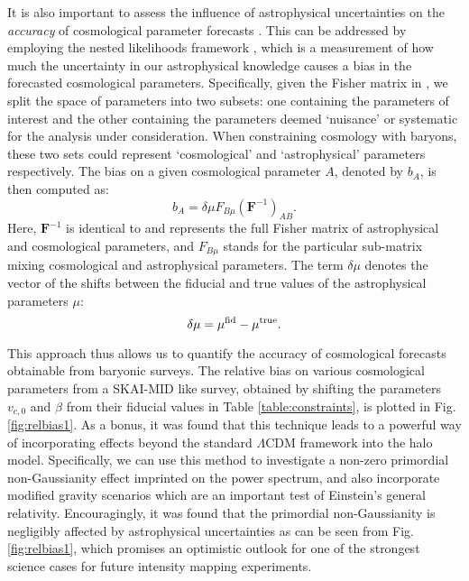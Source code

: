 It is also important to assess the influence of astrophysical uncertainties on the \textit{accuracy} of cosmological parameter forecasts \cite{camera2020}. This can be addressed  by  employing the nested likelihoods framework \cite{Heavens:2007ka}, which is a measurement of how much the uncertainty in our astrophysical knowledge causes a bias in the forecasted cosmological parameters. Specifically, given the Fisher matrix in , we
split the space of parameters into two 
subsets: one containing the parameters of interest and the other containing the parameters
deemed `nuisance' or systematic for the analysis under consideration. When constraining cosmology with baryons,
these two sets could represent `cosmological' and `astrophysical' 
parameters respectively. The bias on a given cosmological parameter $A$, 
denoted by $b_{A}$, is then computed as:
\begin{equation}
b_{A} = \delta \mu F_{B\mu}\left(\mathbf 
F^{-1}\right)_{AB}.\label{eq:bias}
\end{equation}
Here, $\mathbf F^{-1}$ is identical to  and represents the full Fisher matrix of astrophysical and 
cosmological parameters, and $F_{B\mu}$ stands for the particular sub-matrix mixing 
cosmological and astrophysical parameters. The term $\delta \mu$ denotes 
the vector of the shifts between the fiducial and true values of the astrophysical parameters $\mu$:
\begin{equation}
\delta \mu=\mu^{\rm fid}-\mu^{\rm true}.\label{eq:shift}
\end{equation}





This approach thus allows us to quantify the accuracy of cosmological forecasts obtainable from baryonic surveys. The relative bias on various cosmological parameters from a SKAI-MID like survey, obtained by shifting the parameters $v_{c,0}$ and $\beta$ from their fiducial values in Table \ref{table:constraints}, is plotted in Fig. \ref{fig:relbias1}.
As a bonus, it was found that \cite{camera2020} this technique leads to a powerful way of incorporating effects beyond the standard $\Lambda$CDM framework into the halo model. Specifically, we can use this method to investigate a non-zero primordial non-Gaussianity effect imprinted on the power spectrum, and also incorporate modified gravity scenarios which are an important test of Einstein’s general relativity. Encouragingly, it was found that the primordial non-Gaussianity is negligibly affected by astrophysical uncertainties as can be seen from Fig. \ref{fig:relbias1}, which promises an optimistic outlook for one of the strongest science cases for future intensity mapping experiments.

